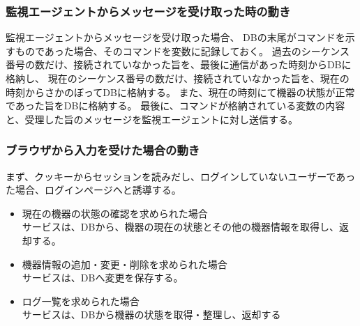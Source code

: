 \subsubsection{監視エージェントからメッセージを受け取った時の動き}
監視エージェントからメッセージを受け取った場合、
DBの末尾がコマンドを示すものであった場合、そのコマンドを変数に記録しておく。
過去のシーケンス番号の数だけ、接続されていなかった旨を、最後に通信があった時刻からDBに格納し、
現在のシーケンス番号の数だけ、接続されていなかった旨を、現在の時刻からさかのぼってDBに格納する。
また、現在の時刻にて機器の状態が正常であった旨をDBに格納する。
最後に、コマンドが格納されている変数の内容と、受理した旨のメッセージを監視エージェントに対し送信する。

\subsubsection{ブラウザから入力を受けた場合の動き}
まず、クッキーからセッションを読みだし、ログインしていないユーザーであった場合、ログインページヘと誘導する。
\begin{itemize}
	\item 現在の機器の状態の確認を求められた場合\\
		サービスは、DBから、機器の現在の状態とその他の機器情報を取得し、返却する。
	\item 機器情報の追加・変更・削除を求められた場合\\
		サービスは、DBへ変更を保存する。
	\item ログ一覧を求められた場合\\
		サービスは、DBから機器の状態を取得・整理し、返却する
\end{itemize}

